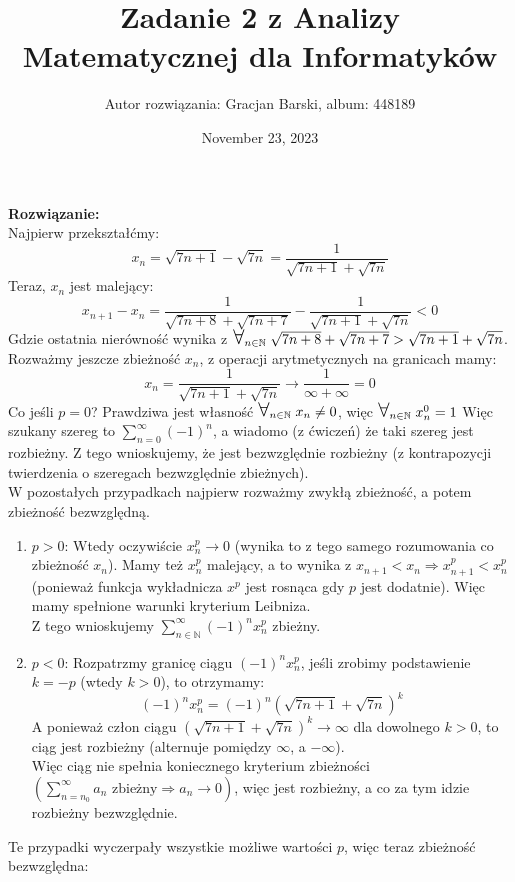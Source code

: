 \documentclass[11pt]{article}
\title{{\bf Zadanie 2 z Analizy Matematycznej dla Informatyków }}
\author{Autor rozwiązania: Gracjan Barski, album: 448189}
\date{November 23, 2023}
\newcommand{\N}{\mathbb{N}}
\newcommand{\Forall}{{\Large\mbox{$\forall$}}}
\begin{document}
\maketitle
\textbf{Rozwiązanie:} \\[10pt]
Najpierw przekształćmy:
$$x_n = \sqrt{7n+1} - \sqrt{7n} = \frac{1}{\sqrt{7n+1}+\sqrt{7n}}$$
Teraz, $x_n$ jest malejący:
$$x_{n+1} - x_n = \frac{1}{\sqrt{7n + 8} + \sqrt{7n + 7}} - \frac{1}{\sqrt{7n+1} + \sqrt{7n}} < 0$$
Gdzie ostatnia nierówność wynika z $\Forall_{n \in \N} \; \sqrt{7n + 8} + \sqrt{7n + 7} > \sqrt{7n+1} + \sqrt{7n}$. Rozważmy jeszcze zbieżność $x_n$, z operacji arytmetycznych na granicach mamy:
$$x_n = \frac{1}{\sqrt{7n+1}+\sqrt{7n}} \longrightarrow \frac{1}{\infty + \infty} = 0$$
Co jeśli $p = 0$? Prawdziwa jest własność $\Forall_{n \in \N} \; x_n \neq 0$, więc $\Forall_{n \in \N} \; x_n^0 = 1$ Więc szukany szereg to $\sum_{n = 0}^\infty (-1)^n$, a wiadomo (z ćwiczeń) że taki szereg jest rozbieżny. Z tego wnioskujemy, że jest bezwzględnie rozbieżny (z kontrapozycji twierdzenia o szeregach bezwzględnie zbieżnych). \\[10pt]
W pozostałych przypadkach najpierw rozważmy zwykłą zbieżność, a potem zbieżność bezwzględną.
\begin{enumerate}[1)]
    \item $p > 0$: Wtedy oczywiście $x_n^p \longrightarrow 0$ (wynika to z tego samego rozumowania co zbieżność $x_n$). Mamy też $x_n^p$ malejący, a to wynika z $x_{n+1} < x_n \Longrightarrow x_{n+1}^p < x_n^p$ (ponieważ funkcja wykładnicza $x ^ p$ jest rosnąca gdy $p$ jest dodatnie). Więc mamy spełnione warunki kryterium Leibniza.\\
    Z tego wnioskujemy $\sum_{n \in \N}^\infty (-1)^n x_n^p$ zbieżny.

    \item $p < 0$: Rozpatrzmy granicę ciągu $(-1)^n x_n^p$, jeśli zrobimy podstawienie $k = -p$ (wtedy $k > 0$), to otrzymamy:
    $$(-1)^n x_n^p = (-1)^n (\sqrt{7n+1} + \sqrt{7n})^k$$
    A ponieważ człon ciągu $(\sqrt{7n+1} + \sqrt{7n})^k \longrightarrow \infty$ dla dowolnego $k > 0$, to ciąg jest rozbieżny (alternuje pomiędzy $\infty$, a $-\infty$). \\[5pt]
    Więc ciąg nie spełnia koniecznego kryterium zbieżności $\left(\sum_{n = n_0}^\infty a_n \text{ zbieżny} \Longrightarrow a_n \longrightarrow 0\right)$, więc jest rozbieżny, a co za tym idzie rozbieżny bezwzględnie. 
\end{enumerate}
Te przypadki wyczerpały wszystkie możliwe wartości $p$, więc teraz zbieżność bezwzględna: \\[5pt]
\end{document}
